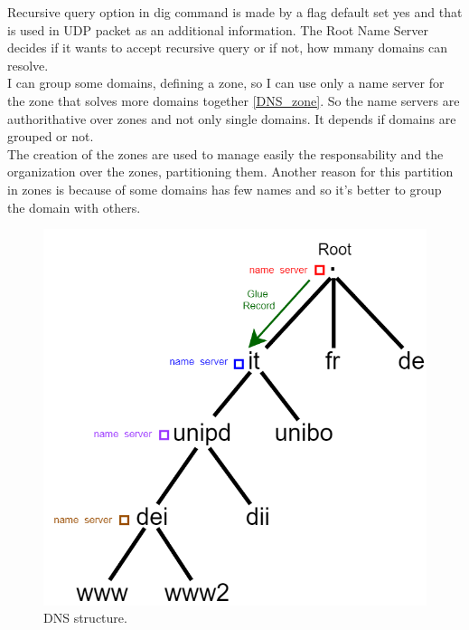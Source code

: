 Recursive query option in dig command is made by a flag default set yes and that is used in UDP packet as an additional information. The Root Name Server decides if it wants to accept recursive query or if not, how mmany domains can resolve.\\
I can group some domains, defining a zone, so I can use only a name server for the zone that solves more domains together \ref{DNS_zone}. So the name servers are authorithative over zones and not only single domains. It depends if domains are grouped or not.\\
The creation of the zones are used to manage easily the responsability and the organization over the zones, partitioning them. Another reason for this partition in zones is because of some domains has few names and so it's better to group the domain with others.
\begin{figure}[h]
\centering
\includegraphics[scale=0.4]{Images/Resolution/DNS_hierarchy}
\caption{\footnotesize{DNS structure.}}\label{DNS_hierarchy}
\end{figure}
